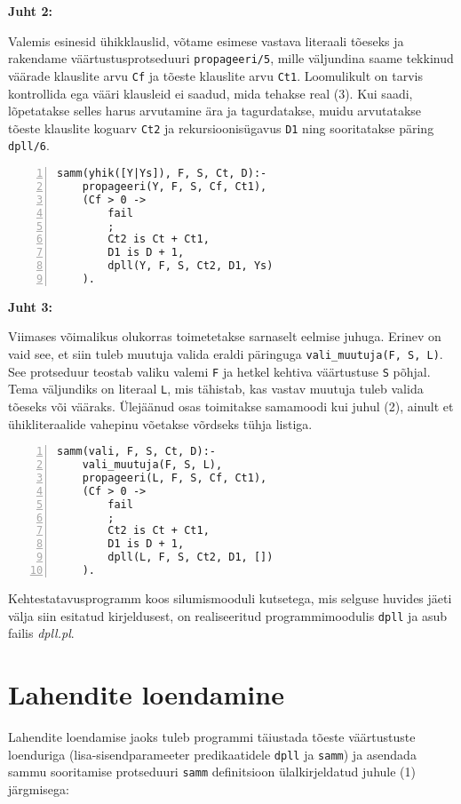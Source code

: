 \textbf{Juht 2:}

Valemis esinesid ühikklauslid, võtame esimese vastava literaali tõeseks ja
rakendame väärtustusprotseduuri \texttt{propageeri/5}, mille väljundina saame
tekkinud väärade klauslite arvu \texttt{Cf} ja tõeste klauslite arvu
\texttt{Ct1}. Loomulikult on tarvis kontrollida ega vääri klausleid
ei saadud, mida tehakse real (3). Kui saadi, lõpetatakse selles harus
arvutamine ära ja tagurdatakse, muidu arvutatakse tõeste klauslite koguarv
\texttt{Ct2} ja rekursioonisügavus \texttt{D1} ning sooritatakse
päring \texttt{dpll/6}.

\begin{lstlisting}[numbers=left,xleftmargin=1cm,basicstyle=\tt]
samm(yhik([Y|Ys]), F, S, Ct, D):-
	propageeri(Y, F, S, Cf, Ct1),
	(Cf > 0 ->
		fail
		;
		Ct2 is Ct + Ct1,
		D1 is D + 1,
		dpll(Y, F, S, Ct2, D1, Ys)
	).
\end{lstlisting}

\textbf{Juht 3:}

Viimases võimalikus olukorras toimetetakse sarnaselt eelmise juhuga. Erinev on
vaid see, et siin tuleb muutuja valida eraldi päringuga \texttt{vali\_muutuja(F,
S, L)}. See protseduur teostab valiku valemi \texttt{F} ja hetkel kehtiva
väärtustuse \texttt{S} põhjal. Tema väljundiks on literaal \texttt{L}, mis
tähistab, kas vastav muutuja tuleb valida tõeseks või vääraks. Ülejäänud osas
toimitakse samamoodi kui juhul (2), ainult et ühikliteraalide vahepinu võetakse
võrdseks tühja listiga. 

\begin{lstlisting}[numbers=left,xleftmargin=1cm,basicstyle=\tt]
samm(vali, F, S, Ct, D):-
	vali_muutuja(F, S, L),
	propageeri(L, F, S, Cf, Ct1),
	(Cf > 0 ->
		fail
		;
		Ct2 is Ct + Ct1,
		D1 is D + 1,
		dpll(L, F, S, Ct2, D1, [])
	).
\end{lstlisting}

Kehtestatavusprogramm koos silumismooduli kutsetega, mis selguse huvides jäeti
välja siin esitatud kirjeldusest, on realiseeritud programmimoodulis
\texttt{dpll} ja asub failis \textit{dpll.pl}.

\section{Lahendite loendamine}

Lahendite loendamise jaoks tuleb programmi täiustada
tõeste väärtustuste loenduriga (lisa-sisendparameeter predikaatidele
\texttt{dpll} ja \texttt{samm}) ja asendada sammu sooritamise protseduuri
\texttt{samm} definitsioon ülalkirjeldatud juhule (1) järgmisega:

